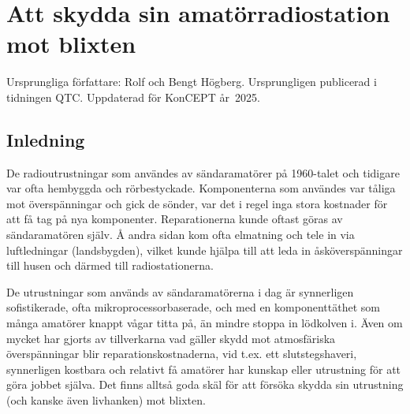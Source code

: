 \chapter{Att skydda sin amatörradiostation mot blixten}
\label{app:aaskskydd}

Ursprungliga författare: Rolf och Bengt Högberg.
Ursprungligen publicerad i tidningen QTC.
Uppdaterad för KonCEPT år~2025.

\section{Inledning}
De radioutrustningar som användes av sändaramatörer på 1960-talet och tidigare
var ofta hembyggda och rörbestyckade.
Komponenterna som användes var tåliga mot överspänningar och gick de sönder, var
det i regel inga stora kostnader för att få tag på nya komponenter.
Reparationerna kunde oftast göras av sändaramatören själv.
Å andra sidan kom ofta elmatning och tele in via luftledningar (landsbygden),
vilket kunde hjälpa till att leda in åsköverspänningar till husen och därmed
till radiostationerna.

De utrustningar som används av sändaramatörerna i dag är synnerligen
sofistikerade, ofta mikroprocessorbaserade, och med en komponenttäthet som många
amatörer knappt vågar titta på, än mindre stoppa in lödkolven i.
Även om mycket har gjorts av tillverkarna vad gäller skydd mot atmosfäriska
överspänningar blir reparationskostnaderna, vid t.ex. ett slutstegshaveri,
synnerligen kostbara och relativt få amatörer har kunskap eller utrustning för
att göra jobbet själva.
Det finns alltså goda skäl för att försöka skydda sin utrustning (och kanske
även livhanken) mot blixten.


